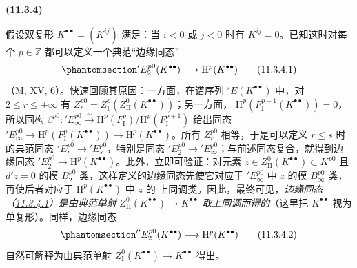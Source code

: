 \documentclass[UTF8,fontset=none,11pt,oneside,openany]{ctexbook}
\newenvironment{env}[1][]{%
  \par\medskip\noindent\textbf{(#1)}\ %
}{\par}
\let\EGAOriginalLabel\label
\renewcommand{\label}[1]{\phantomsection\EGAOriginalLabel{#1}}
\begin{document}
\begin{env}[11.3.4]
\label{0.11.3.4-fr}
假设双复形 $K^{\bullet\bullet}=(K^{ij})$ 满足：当 $i<0$ 或 $j<0$ 时有
$K^{ij}=0$。已知这时对每个 $p\in\mathbb Z$ 都可以定义一个典范“边缘同态”
\[
\label{0.11.3.4.1-fr}
  'E_2^{p0}(K^{\bullet\bullet})\longrightarrow
  \mathrm H^p(K^{\bullet\bullet})
  \tag{11.3.4.1}
\]
（M, XV, 6）。快速回顾其原因：一方面，在谱序列
$'E(K^{\bullet\bullet})$ 中，对 $2\leq r\leq+\infty$ 有
$Z_r^{p0}=Z_{\mathrm I}^p(Z_{\mathrm{II}}^0(K^{\bullet\bullet}))$；另一方面，
$\mathrm H^p(F_{\mathrm I}^{p+1}(K^{\bullet\bullet}))=0$，所以同构
$\beta^{p0}:'E_\infty^{p0}\xrightarrow{\sim}
\mathrm H^p(F_{\mathrm I}^p)/\mathrm H^p(F_{\mathrm I}^{p+1})$ 给出同态
$'E_\infty^{p0}\to\mathrm H^p(F_{\mathrm I}^p(K^{\bullet\bullet}))
\to\mathrm H^p(K^{\bullet\bullet})$。所有 $Z_r^{p0}$ 相等，于是可以定义
$r\leq s$ 时的典范同态 $'E_r^{p0}\to'E_s^{p0}$，特别是同态
$'E_2^{p0}\to'E_\infty^{p0}$；与前述同态复合，就得到边缘同态
$'E_2^{p0}\to\mathrm H^p(K^{\bullet\bullet})$。此外，立即可验证：对元素
$z\in Z_{\mathrm{II}}^0(K^{\bullet\bullet})\subset K^{p0}$ 且 $d'z=0$ 的模
$B_2^{p0}$ 类，这样定义的边缘同态先使它对应于 $'E_\infty^{p0}$ 中 $z$ 的模
$B_\infty^{p0}$ 类，再使后者对应于 $\mathrm H^p(K^{\bullet\bullet})$ 中 $z$ 的
上同调类。因此，最终可见，\emph{边缘同态
（\hyperref[0.11.3.4.1-fr]{11.3.4.1}）是由典范单射}
$Z_{\mathrm{II}}^0(K^{\bullet\bullet})\to K^{\bullet\bullet}$
\emph{取上同调而得的}（这里把 $K^{\bullet\bullet}$ 视为单复形）。同样，边缘同态
\[
\label{0.11.3.4.2-fr}
  ''E_2^{p0}(K^{\bullet\bullet})\longrightarrow
  \mathrm H^p(K^{\bullet\bullet})
  \tag{11.3.4.2}
\]
自然可解释为由典范单射
$Z_{\mathrm I}^0(K^{\bullet\bullet})\to K^{\bullet\bullet}$ 得出。
\end{env}
\end{document}
